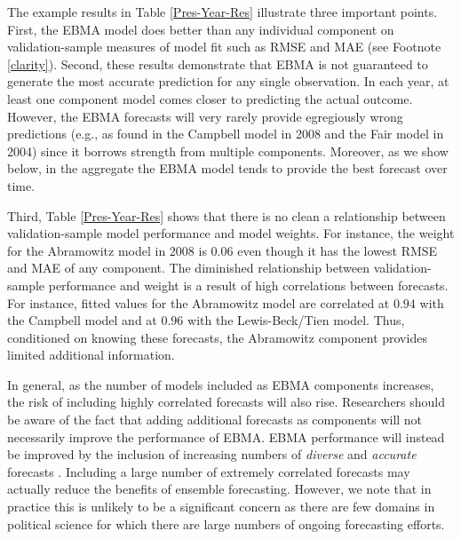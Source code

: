  The example results in Table \ref{Pres-Year-Res} illustrate three
 important points.  First, the EBMA model does better than any
 individual component on validation-sample measures of model fit such
 as RMSE and MAE (see Footnote \ref{clarity}).  Second, these results
 demonstrate that EBMA is not guaranteed to generate the most accurate
 prediction for any single observation.  In each year, at least one
 component model comes closer to predicting the actual outcome.
 However, the EBMA forecasts will very rarely provide egregiously
 wrong predictions (e.g., as found in the Campbell model in 2008 and
 the Fair model in 2004) since it borrows strength from multiple
 components.  Moreover, as we show below, in the aggregate the EBMA
 model tends to provide the best forecast over time.

 Third, Table \ref{Pres-Year-Res} shows that there is no clean a
 relationship between validation-sample model performance and model
 weights. For instance, the weight for the Abramowitz model in 2008 is
 $0.06$ even though it has the lowest RMSE and MAE of any component.
 The diminished relationship between validation-sample performance and
 weight is a result of high correlations between forecasts.
For instance, fitted values for the Abramowitz model are correlated at
$0.94$ with the Campbell model and at $0.96$ with the Lewis-Beck/Tien
model. Thus, conditioned on knowing these forecasts, the Abramowitz
component provides limited additional information.  

In general, as the number of models included as EBMA components
increases, the risk of including highly correlated forecasts will also
rise.  Researchers should be aware of the fact that adding additional
forecasts as components will not necessarily improve the performance
of EBMA.  EBMA performance will instead be improved by the inclusion
of increasing numbers of \textit{diverse} and \textit{accurate}
forecasts \citep[see also,][]{Graefe:2010}.  Including a large number
of extremely correlated forecasts may actually reduce the benefits of
ensemble forecasting.  However, we note that in practice this is
unlikely to be a significant concern as there are few domains in
political science for which there are large numbers of ongoing
forecasting efforts.


